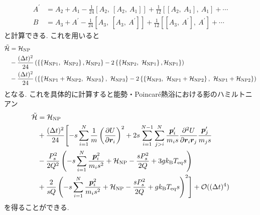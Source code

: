 \begin{align}
  A^{\prime}
  &=
  A_{2} + A_{1}
  -\frac{1}{24}[A_{2},~[A_{2},~A_{1}]] 
  +\frac{1}{12}[[A_{2},~A_{1}],~A_{1}] + \cdots
  \\
  B
  &=
  A_{3} + A^{\prime}
  -\frac{1}{24}[A_{3},~[A_{3},~A^{\prime}]] 
  +\frac{1}{12}[[A_{3},~A^{\prime}],~A^{\prime}] + \cdots
\end{align}
と計算できる. これを用いると
\begin{align}
  \Tilde{\mathcal{H}}
  &=
  \mathcal{H}_\mathrm{NP}
  \notag \\
  &-
  \frac{(\Delta t)^{2}}{24}
  \left(
    \left\{
      \left\{\mathcal{H}_{\mathrm{NP1}},~ \mathcal{H}_{\mathrm{NP2}}\right\},
      \mathcal{H}_{\mathrm{NP2}}
    \right\}
    -2
    \left\{
      \left\{\mathcal{H}_{\mathrm{NP2}},~ \mathcal{H}_{\mathrm{NP1}}\right\},
      \mathcal{H}_{\mathrm{NP1}}
    \right\}
  \right)
  \notag \\
  &-
  \frac{(\Delta t)^{2}}{24}
  \left(
    \left\{
    \left\{
      \mathcal{H}_{\mathrm{NP1}}+\mathcal{H}_{\mathrm{NP2}},~
      \mathcal{H}_{\mathrm{NP3}}
    \right\},~
    \mathcal{H}_{\mathrm{NP3}}
    \right\}
    -2
    \left\{
    \left\{
      \mathcal{H}_{\mathrm{NP3}},~
      \mathcal{H}_{\mathrm{NP1}}+\mathcal{H}_{\mathrm{NP2}}
    \right\},~
    \mathcal{H}_{\mathrm{NP1}}+\mathcal{H}_{\mathrm{NP2}}
    \right\}
  \right)
\end{align}
となる. これを具体的に計算すると能勢・Poincar\'{e}熱浴における影のハミルトニアン
\begin{alignat}{4}
  \Tilde{\mathcal{H}}
  &=
  \mathcal{H}_\mathrm{NP}
  \notag \\
  &+
  \frac{(\Delta t)^{2}}{24}
  \Biggl[
    -s
    \sum_{i=1}^{N}
    \frac{1}{m}
    \left(\frac{\partial U}{\partial \bm{r}_{i}}\right)^{2}
    +
    2s
    \sum_{i=1}^{N-1}\sum_{j>i}^{N}
    \frac{\bm{p}_{i}^{\prime}}{m_{i}s}
    \frac{\partial^{2} U}{\partial \bm{r}_{i} \bm{r}_{j}}
    \frac{\bm{p}_{j}^{\prime}}{m_{j}s}
    \notag \\
    &-
    \frac{P_{s}^{2}}{2Q^{2}}
    \left(
      -s
      \sum_{i=1}^{N}
      \frac{\bm{p}_{i}^{2}}{m_{i}s^{2}}
      +
      \mathcal{H}_{\mathrm{NP}}
      -
      \frac{s P_{s}^{2}}{2Q}
      + 3g k_{\mathrm{B}} T_{\mathrm{eq}} s
    \right)
    \notag \\
    &+
    \frac{2}{sQ}
    \left(
      -s
      \sum_{i=1}^{N}
      \frac{\bm{p}_{i}^{2}}{m_{i}s^{2}}
      +
      \mathcal{H}_{\mathrm{NP}}
      -
      \frac{sP_{s}^{2}}{2Q}
      +
      g k_{\mathrm{B}} T_{\mathrm{eq}} s
    \right)^{2}
  \Biggr]
  +
  \mathcal{O}((\Delta t)^{4})
\end{alignat}
を得ることができる.

